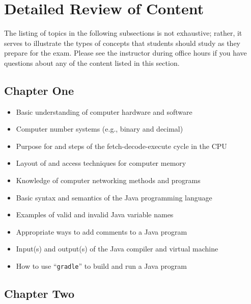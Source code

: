 \documentclass[11pt]{article}
\newcommand{\command}[1]{``\lstinline{#1}''}
\begin{document}
\section*{Detailed Review of Content}

The listing of topics in the following subsections is not exhaustive; rather, it
serves to illustrate the types of concepts that students should study as they
prepare for the exam. Please see the instructor during office hours if you have
questions about any of the content listed in this section.

\vspace*{-.1in}
\subsection*{Chapter One}

\begin{itemize}

  \itemsep 0in

  \item Basic understanding of computer hardware and software
  \item Computer number systems (e.g., binary and decimal)
  \item Purpose for and steps of the fetch-decode-execute cycle in the CPU
  \item Layout of and access techniques for computer memory
  \item Knowledge of computer networking methods and programs
  \item Basic syntax and semantics of the Java programming language
  \item Examples of valid and invalid Java variable names
  \item Appropriate ways to add comments to a Java program
  \item Input(s) and output(s) of the Java compiler and virtual machine
  \item How to use \command{gradle} to build and run a Java program

\end{itemize}

\vspace*{-.2in}
\subsection*{Chapter Two}
\end{document}
